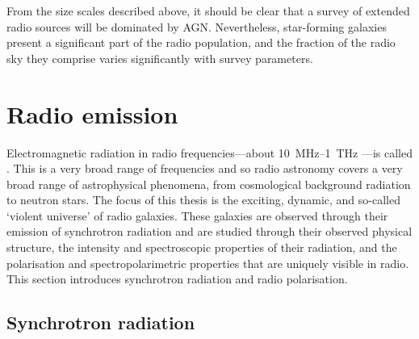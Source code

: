     From the size scales described above, it should be clear that a survey of extended radio sources will be dominated by AGN. Nevertheless, star-forming galaxies present a significant part of the radio population, and the fraction of the radio sky they comprise varies significantly with survey parameters.

\section{Radio emission}
\label{sec:radio-astronomy}

    Electromagnetic radiation in radio frequencies---about 10~MHz--1~THz \citep{condon_essential_2016}---is called . This is a very broad range of frequencies and so radio astronomy covers a very broad range of astrophysical phenomena, from cosmological background radiation to neutron stars. The focus of this thesis is the exciting, dynamic, and so-called `violent universe' of radio galaxies. These galaxies are observed through their emission of synchrotron radiation and are studied through their observed physical structure, the intensity and spectroscopic properties of their radiation, and the polarisation and spectropolarimetric properties that are uniquely visible in radio. This section introduces synchrotron radiation and radio polarisation.

    \subsection{Synchrotron radiation}
    \label{sec:synchrotron}

